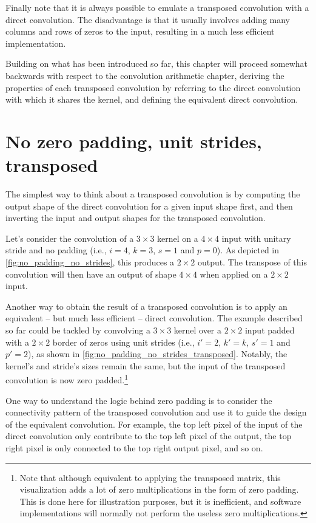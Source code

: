 \documentclass[notitlepage]{report}
\begin{document}
Finally note that it is always possible to emulate a transposed convolution with
a direct convolution. The disadvantage is that it usually involves adding many
columns and rows of zeros to the input, resulting in a much less efficient
implementation.

Building on what has been introduced so far, this chapter will proceed somewhat
backwards with respect to the convolution arithmetic chapter, deriving the
properties of each transposed convolution by referring to the direct
convolution with which it shares the kernel, and defining the equivalent direct
convolution.

\section{No zero padding, unit strides, transposed}

The simplest way to think about a transposed convolution is by computing the
output shape of the direct convolution for a given input shape first, and then
inverting the input and output shapes for the transposed convolution.

Let's consider the convolution of a $3 \times 3$ kernel on a $4 \times 4$
input with unitary stride and no padding (i.e., $i = 4$, $k = 3$, $s = 1$ and
$p = 0$). As depicted in \autoref{fig:no_padding_no_strides}, this produces a
$2 \times 2$ output. The transpose of this convolution will then have an output
of shape $4 \times 4$ when applied on a $2 \times 2$ input.

Another way to obtain the result of a transposed convolution is to apply an
equivalent -- but much less efficient -- direct convolution. The example
described so far could be tackled by convolving a $3 \times 3$ kernel over a
$2 \times 2$ input padded with a $2 \times 2$ border of zeros using unit
strides (i.e., $i' = 2$, $k' = k$, $s' = 1$ and $p' = 2$), as shown in
\autoref{fig:no_padding_no_strides_transposed}. Notably, the kernel's and
stride's sizes remain the same, but the input of the transposed convolution is
now zero padded.\footnote{Note that although
    equivalent to applying the transposed matrix, this visualization adds a lot
    of zero multiplications in the form of zero padding.  This is done here for
    illustration purposes, but it is inefficient, and software implementations
    will normally not perform the useless zero multiplications.}

One way to understand the logic behind zero padding is to consider the
connectivity pattern of the transposed convolution and use it to guide the
design of the equivalent convolution. For example, the top left pixel of the
input of the direct convolution only contribute to the top left pixel of the
output, the top right pixel is only connected to the top right output pixel,
and so on.
\end{document}
